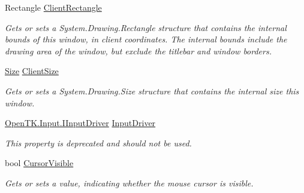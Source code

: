 \begin{DoxyCompactItemize}
Rectangle \hyperlink{interface_open_t_k_1_1_i_native_window_a3031c1f6c7096ca84bc65d2b3baea88d}{Client\-Rectangle}
\begin{DoxyCompactList}\small\item\em Gets or sets a System.\-Drawing.\-Rectangle structure that contains the internal bounds of this window, in client coordinates. The internal bounds include the drawing area of the window, but exclude the titlebar and window borders. \end{DoxyCompactList}\item 
\hyperlink{interface_open_t_k_1_1_i_native_window_a987289178e2f63ce7eaf58d9cbe72ed5}{Size} \hyperlink{interface_open_t_k_1_1_i_native_window_a3944c60601079d09e524f455a993d6cf}{Client\-Size}
\begin{DoxyCompactList}\small\item\em Gets or sets a System.\-Drawing.\-Size structure that contains the internal size this window. \end{DoxyCompactList}\item 
\hyperlink{interface_open_t_k_1_1_input_1_1_i_input_driver}{Open\-T\-K.\-Input.\-I\-Input\-Driver} \hyperlink{interface_open_t_k_1_1_i_native_window_aca0d227f0b84dd93ba5135cc9f51ce56}{Input\-Driver}
\begin{DoxyCompactList}\small\item\em This property is deprecated and should not be used. \end{DoxyCompactList}\item 
bool \hyperlink{interface_open_t_k_1_1_i_native_window_a584d510ec285e8aadd8c523389a447ff}{Cursor\-Visible}
\begin{DoxyCompactList}\small\item\em Gets or sets a value, indicating whether the mouse cursor is visible. \end{DoxyCompactList}\end{DoxyCompactItemize}
